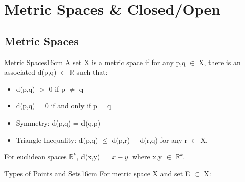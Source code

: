 \newpage

\section[Day 5: Metric Spaces and Closed/Open]{ Metric Spaces \& Closed/Open }

\subsection{ Metric Spaces }

	\begin{definition}{Metric Spaces}{16cm}
		A set X is a {\color{lblue} metric space} if for any p,q $\in$ X,
		there is an associated d(p,q) $\in$ $\mathbb{R}$ such that:

		\begin{itemize}[leftmargin=1cm, itemsep=0.1cm]
			\item d(p,q) $>$ 0 \hspace{1cm} if p $\neq$ q
			
			\item d(p,q) = 0 if and only if p = q
			
			\item {\color{lgreen} Symmetry}:
				d(p,q) = d(q,p)
			
			\item {\color{lgreen} Triangle Inequality}:
				d(p,q) $\leq$ d(p,r) + d(r,q)
				\hspace{1cm}
				for any r $\in$ X.
		\end{itemize}

		For euclidean spaces $\mathbb{R}^k$,
		d(x,y) = $| x - y |$ where x,y $\in$ $\mathbb{R}^k$.
	\end{definition}

	\vspace{0.5cm}



	\begin{definition}{Types of Points and Sets}{16cm}
		For metric space X and set E $\subset$ X:
	\end{definition}
	
